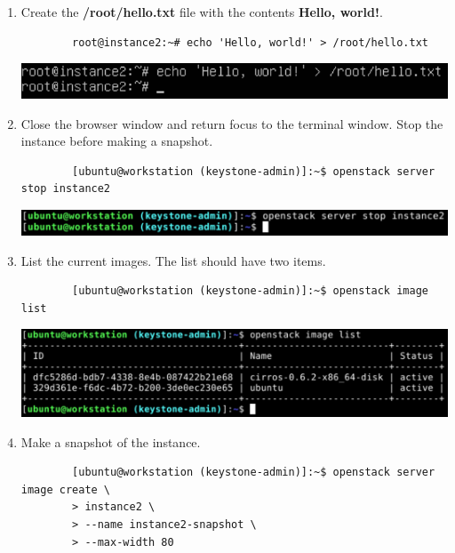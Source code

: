 \documentclass[letterpaper, 12pt]{article}
\begin{document}
\begin{enumerate}
    \item Create the \textbf{/root/hello.txt} file with the contents \textbf{Hello, world!}.
    \begin{lstlisting}
        root@instance2:~# echo 'Hello, world!' > /root/hello.txt
    \end{lstlisting}

    \begin{center}
        \includegraphics[width=\linewidth]{images/part2/step7.png}
    \end{center}

    \item Close the browser window and return focus to the terminal window. Stop the instance before making a snapshot.
    \begin{lstlisting}
        [ubuntu@workstation (keystone-admin)]:~$ openstack server stop instance2
    \end{lstlisting}

    \begin{center}
        \includegraphics[width=\linewidth]{images/part2/step8.png}
    \end{center}

    \item List the current images. The list should have two items.
    \begin{lstlisting}
        [ubuntu@workstation (keystone-admin)]:~$ openstack image list
    \end{lstlisting}

    \begin{center}
        \includegraphics[width=\linewidth]{images/part2/step9.png}
    \end{center}

    \item Make a snapshot of the instance.
    \begin{lstlisting}
        [ubuntu@workstation (keystone-admin)]:~$ openstack server image create \
        > instance2 \
        > --name instance2-snapshot \
        > --max-width 80
    \end{lstlisting}


\end{enumerate}
\end{document}
